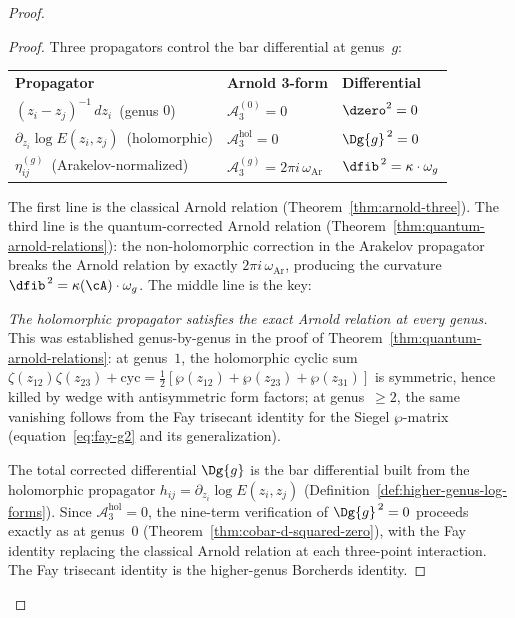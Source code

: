 \begin{proof}
\begin{proof}
Three propagators control the bar differential at genus~$g$:
\begin{center}
\small
\begin{tabular}{lll}
\textbf{Propagator} & \textbf{Arnold 3-form} & \textbf{Differential} \\[2pt]
$(z_i - z_j)^{-1}\,dz_i$ \,(genus $0$) &
  $\mathcal{A}_3^{(0)} = 0$ &
  $\dzero^2 = 0$ \\[2pt]
$\partial_{z_i}\!\log E(z_i,z_j)$ \,(holomorphic) &
  $\mathcal{A}_3^{\mathrm{hol}} = 0$ &
  $\Dg{g}^{\,2} = 0$ \\[2pt]
$\eta_{ij}^{(g)}$ \,(Arakelov-normalized) &
  $\mathcal{A}_3^{(g)} = 2\pi i\,\omega_{\mathrm{Ar}}$ &
  $\dfib^{\,2} = \kappa\cdot\omega_g$
\end{tabular}
\end{center}
The first line is the classical Arnold relation
(Theorem~\ref{thm:arnold-three}).
The third line is the quantum-corrected Arnold relation
(Theorem~\ref{thm:quantum-arnold-relations}):
the non-holomorphic correction in the Arakelov propagator
breaks the Arnold relation by exactly
$2\pi i\,\omega_{\mathrm{Ar}}$, producing the curvature
$\dfib^{\,2} = \kappa(\cA)\cdot\omega_g$.
The middle line is the key:

\emph{The holomorphic propagator satisfies the exact Arnold
relation at every genus.}  This was established
genus-by-genus in the proof of
Theorem~\ref{thm:quantum-arnold-relations}:
at genus~$1$, the holomorphic cyclic sum
$\zeta(z_{12})\zeta(z_{23}) + \mathrm{cyc}
= \frac{1}{2}[\wp(z_{12}) + \wp(z_{23}) + \wp(z_{31})]$
is symmetric, hence killed by wedge with antisymmetric
form factors; at genus~$\geq 2$, the same vanishing
follows from the Fay trisecant identity for the Siegel
$\wp$-matrix (equation~\eqref{eq:fay-g2} and its
generalization).

The total corrected differential $\Dg{g}$ is the bar
differential built from the holomorphic propagator
$h_{ij} = \partial_{z_i}\!\log E(z_i, z_j)$
(Definition~\ref{def:higher-genus-log-forms}).
Since $\mathcal{A}_3^{\mathrm{hol}} = 0$, the nine-term
verification of $\Dg{g}^{\,2} = 0$ proceeds exactly as at
genus~$0$ (Theorem~\ref{thm:cobar-d-squared-zero}),
with the Fay identity replacing the classical Arnold
relation at each three-point interaction.
The Fay trisecant identity is the higher-genus
Borcherds identity.


\end{proof}
\end{proof}
